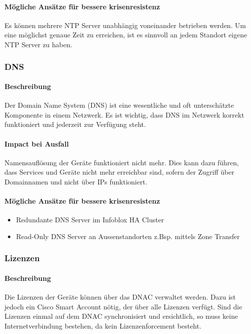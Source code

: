 \paragraph{Mögliche Ansätze für bessere krisenresistenz}
Es können mehrere NTP Server unabhängig voneinander betrieben werden. Um eine möglichst genaue Zeit zu erreichen, ist es sinnvoll an jedem Standort eigene NTP Server zu haben.

\subsubsection{DNS}
\paragraph{Beschreibung}
Der Domain Name System (DNS) ist eine wesentliche und oft unterschätzte Komponente in einem Netzwerk. Es ist wichtig, dass DNS im Netzwerk korrekt funktioniert und jederzeit zur Verfügung steht.

\paragraph{Impact bei Ausfall}
Namensauflösung der Geräte funktioniert nicht mehr. Dies kann dazu führen, dass Services und Geräte nicht mehr erreichbar sind, sofern der Zugriff über Domainnamen und nicht über IPs funktioniert.

\paragraph{Mögliche Ansätze für bessere krisenresistenz}
\begin{itemize}
	\item Redundante DNS Server im Infoblox HA Cluster
	\item Read-Only DNS Server an Aussenstandorten z.Bsp. mittels Zone Transfer
\end{itemize}

\subsubsection{Lizenzen}
\paragraph{Beschreibung}
Die Lizenzen der Geräte können über das DNAC verwaltet werden. Dazu ist jedoch ein Cisco Smart Account nötig, der über alle Lizenzen verfügt. Sind die Lizenzen einmal auf dem DNAC synchronisiert und ersichtlich, so muss keine Internetverbindung bestehen, da kein Lizenzenforcement besteht.

